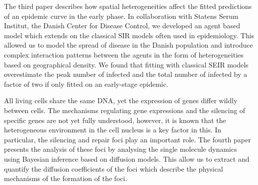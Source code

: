 The third paper describes how spatial heterogeneities affect the fitted predictions of an epidemic curve in the early phase. In collaboration with Statens Serum Institut, the Danish Center for Disease Control, we developed an agent based model which extends on the classical SIR models often used in epidemiology. This allowed us to model the spread of disease in the Danish population and introduce complex interaction patterns between the agents in the form of heterogeneities based on geographical density. We found that fitting with classical SEIR models overestimate the peak number of infected and the total number of infected by a factor of two if only fitted on an early-stage epidemic.

All living cells share the same DNA, yet the expression of genes differ wildly between cells. The mechanisms regulating gene expressions and the silencing of specific genes are not yet fully understood, however, it is known that the heterogeneous environment in the cell nucleus is a key factor in this. In particular, the silencing and repair foci play an important role. The fourth paper presents the analysis of these foci by analysing the single molecule dynamics using Bayesian inference based on diffusion models. This allow us to extract and quantify the diffusion coefficients of the foci which describe the physical mechanisms of the formation of the foci.